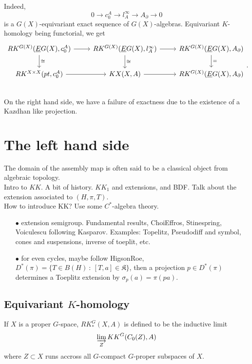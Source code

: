 Indeed, 
\[ 0 \rightarrow  c_0^A \rightarrow l^\infty_A \rightarrow A_\partial \rightarrow 0\]
is a $G(X)$-equivariant exact sequence of $G(X)$-algebras. Equivariant $K$-homology being functorial, we get 
\[\begin{tikzcd} 
RK^{G(X)}(\underline E G(X) , c_0^A)  \arrow{r}\arrow{d}{\cong} &  RK^{G(X)}(\underline E G(X) , l^\infty_A) \arrow{r}\arrow{d}{\cong} & RK^{G(X)}(\underline E G(X) , A_\partial ) \arrow{d}{=}\\
 RK^{X\times X}(pt , c_0^A) \arrow{r}& KX(X,A) \arrow{r} &  RK^{G(X)}(\underline E G(X) , A_\partial ) \\
\end{tikzcd}.\]
On the right hand side, we have a failure of exactness due to the existence of a Kazdhan like projection.

\section{The left hand side}

The domain of the assembly map is often said to be a classical object from algebraic topology.\\

Intro to $KK$. A bit of history. $KK_1$ and extensions, and BDF. Talk about the extension associated to $(H,\pi,T)$.\\

How to introduce KK? Use some $C^*$-algebra theory.
\begin{itemize}
\item[$\bullet$] extension semigroup. Fundamental results, ChoiEffros, Stinespring, Voiculescu following Kasparov. Examples: Topelitz, Pseudodiff and symbol, cones and suspensions, inverse of toeplit, etc.
\item[$\bullet$] for even cycles, maybe follow HigsonRoe, $D^*(\pi) = \{ T\in B(H) \ : \ [T,a]\in \mathfrak K\}$, then a projection $p\in D^*(\pi)$ determines a Toeplitz extension by $\sigma_p(a)=\pi(pa)$.
\end{itemize}


\subsection{Equivariant $K$-homology}

If $X$ is a proper $G$-space, $RK_*^G(X,A)$ is defined to be the inductive limit
\[ \varinjlim_{Z} KK^G(C_0(Z),A)\]
where $Z\subset X$ runs accross all $G$-compact $G$-proper subspaces of $X$.


